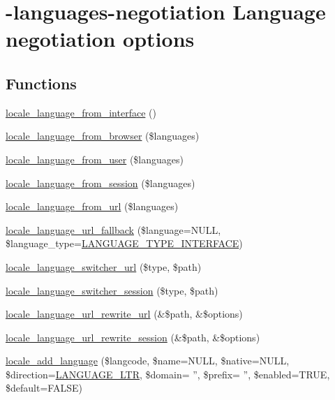 \hypertarget{group__locale}{
\section{-\/languages-\/negotiation Language negotiation options}
\label{group__locale}
}
\subsection*{Functions}
\begin{DoxyCompactItemize}
\item 
\hyperlink{group__locale_ga951d63c38235f5186fe6165589c4303f}{locale\_\-language\_\-from\_\-interface} ()
\item 
\hyperlink{group__locale_ga07f1b17e9dd116d07f6a2a02bfd6915e}{locale\_\-language\_\-from\_\-browser} (\$languages)
\item 
\hyperlink{group__locale_gae7cfd386cb96e33f7728374ef2e3dc42}{locale\_\-language\_\-from\_\-user} (\$languages)
\item 
\hyperlink{group__locale_ga4a15e35684fc4fe7a9486b5beee06f1b}{locale\_\-language\_\-from\_\-session} (\$languages)
\item 
\hyperlink{group__locale_gaf8f7a2acb2a80fbd8897437ab8eba1d6}{locale\_\-language\_\-from\_\-url} (\$languages)
\item 
\hyperlink{group__locale_ga0fe34148ed5e348c43882bcb3f9e418c}{locale\_\-language\_\-url\_\-fallback} (\$language=NULL, \$language\_\-type=\hyperlink{bootstrap_8inc_adcc8b40b0d1ee5cd37f1c7314cc541dc}{LANGUAGE\_\-TYPE\_\-INTERFACE})
\item 
\hyperlink{group__locale_ga73c68f3cdad0f635f29bdd5268d81af5}{locale\_\-language\_\-switcher\_\-url} (\$type, \$path)
\item 
\hyperlink{group__locale_ga62ade6d961ed1194a462bc27873fee64}{locale\_\-language\_\-switcher\_\-session} (\$type, \$path)
\item 
\hyperlink{group__locale_gaafdcd20ea42d6ce5573ece18d3fb9cdd}{locale\_\-language\_\-url\_\-rewrite\_\-url} (\&\$path, \&\$options)
\item 
\hyperlink{group__locale_ga510f99d2bec3b7011fe45efed603b1d5}{locale\_\-language\_\-url\_\-rewrite\_\-session} (\&\$path, \&\$options)
\item 
\hyperlink{group__locale_ga9fc28b9f10f5aaa7cb733dc0145018a2}{locale\_\-add\_\-language} (\$langcode, \$name=NULL, \$native=NULL, \$direction=\hyperlink{bootstrap_8inc_a8790965df4de009fe8bdcf17f6a5c738}{LANGUAGE\_\-LTR}, \$domain= '', \$prefix= '', \$enabled=TRUE, \$default=FALSE)

\end{DoxyCompactItemize}
